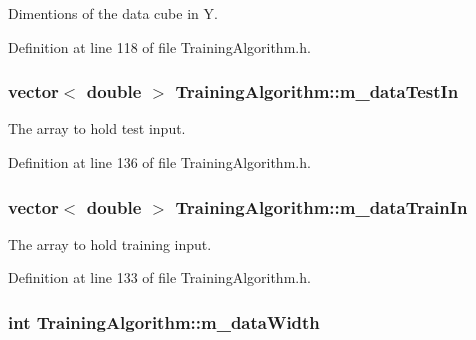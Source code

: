 Dimentions of the data cube in Y. 



Definition at line 118 of file Training\+Algorithm.\+h.

\subsubsection[{\texorpdfstring{m\+\_\+data\+Test\+In}{m_dataTestIn}}]{\setlength{\rightskip}{0pt plus 5cm}vector$<$ double $>$ Training\+Algorithm\+::m\+\_\+data\+Test\+In\hspace{0.3cm}{\ttfamily [private]}}\hypertarget{classTrainingAlgorithm_ad92157e128c9165861ef003216621039}{}\label{classTrainingAlgorithm_ad92157e128c9165861ef003216621039}


The array to hold test input. 



Definition at line 136 of file Training\+Algorithm.\+h.

\subsubsection[{\texorpdfstring{m\+\_\+data\+Train\+In}{m_dataTrainIn}}]{\setlength{\rightskip}{0pt plus 5cm}vector$<$ double $>$ Training\+Algorithm\+::m\+\_\+data\+Train\+In\hspace{0.3cm}{\ttfamily [private]}}\hypertarget{classTrainingAlgorithm_aeac2031120727ea87473eeb08a0d2386}{}\label{classTrainingAlgorithm_aeac2031120727ea87473eeb08a0d2386}


The array to hold training input. 



Definition at line 133 of file Training\+Algorithm.\+h.

\subsubsection[{\texorpdfstring{m\+\_\+data\+Width}{m_dataWidth}}]{\setlength{\rightskip}{0pt plus 5cm}int Training\+Algorithm\+::m\+\_\+data\+Width\hspace{0.3cm}{\ttfamily [private]}}\hypertarget{classTrainingAlgorithm_a48fc87fac249f686265d603f94e16a05}{}\label{classTrainingAlgorithm_a48fc87fac249f686265d603f94e16a05}


